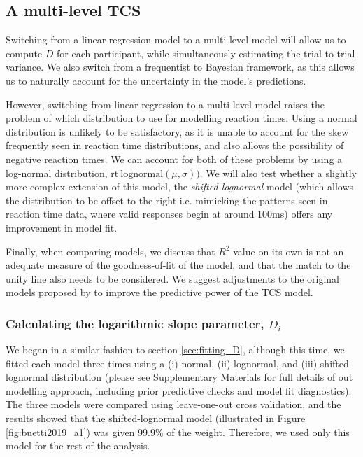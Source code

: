 \documentclass[smallextended, natbib]{svjour3}       %
\begin{document}
\subsection{A multi-level TCS}

Switching from a linear regression model to a multi-level model will allow us to compute $D$ for each participant, while simultaneously estimating the trial-to-trial variance. We also switch from a frequentist to Bayesian framework, as this allows us to naturally account for the uncertainty in the model's predictions.

However, switching from linear regression to a multi-level model raises the problem of which distribution to use for modelling reaction times. Using a normal distribution is unlikely to be satisfactory, as it is unable to account for the skew frequently seen in reaction time distributions, and also allows the possibility of negative reaction times. We can account for both of these problems by using a log-normal distribution, $\text{rt} ~ \text{lognormal}(\mu, \sigma))$. We will also test whether a slightly more complex extension of this model, the \textit{shifted lognormal} model (which allows the distribution to be offset to the right i.e. mimicking the patterns seen in reaction time data, where valid responses begin at around 100ms) offers any improvement in model fit.

Finally, when comparing models, we discuss that $R^2$ value on its own is not an adequate measure of the goodness-of-fit of the model, and that the match to the unity line also needs to be considered. We suggest adjustments to the original models proposed by \citep{buetti2019predicting} to improve the predictive power of the TCS model.

\subsubsection{Calculating the logarithmic slope parameter, $D_i$}

We began in a similar fashion to section \ref{sec:fitting_D}, although this time, we fitted each model three times using a (i) normal, (ii) lognormal, and (iii) shifted lognormal distribution (please see Supplementary Materials for full details of out modelling approach, including prior predictive checks and model fit diagnostics). The three models were compared using leave-one-out cross validation, and the results showed that the shifted-lognormal model (illustrated in Figure \ref{fig:buetti2019_a1}) was given $99.9\%$ of the weight. Therefore, we used only this model for the rest of the analysis. 
\end{document}
